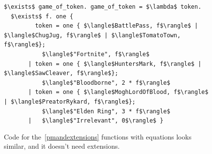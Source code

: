 \documentclass[manuscript,screen,12pt, nonacm]{acmart}
\begin{document}
\begin{figure}[ht]
        \begin{minipage}[h]{\linewidth}
          \verselst
          \begin{lstlisting}[numbers=none, basicstyle=\tiny, xleftmargin=9em, 
                            frame=single, showstringspaces=false]
$\exists$ game_of_token. game_of_token = $\lambda$ token. 
  $\exists$ f. one {
         token = one { $\langle$BattlePass, f$\rangle$ | $\langle$ChugJug, f$\rangle$ | $\langle$TomatoTown, f$\rangle$}; 
           $\langle$"Fortnite", f$\rangle$
       | token = one { $\langle$HuntersMark, f$\rangle$ | $\langle$SawCleaver, f$\rangle$}; 
           $\langle$"Bloodborne", 2 * f$\rangle$
       | token = one { $\langle$MoghLordOfBlood, f$\rangle$ | $\langle$PreatorRykard, f$\rangle$}; 
           $\langle$"Elden Ring", 3 * f$\rangle$
       |   $\langle$"Irrelevant", 0$\rangle$ }
          \end{lstlisting}
            \label{fig:versegot} 
        \vspace{4ex}
        \end{minipage}%
    \caption{Code for the~\ref{pmandextensions} functions with equations looks
    similar, and it doesn't need extensions.}
    \label{fig:verseextfuncs}
      \end{figure}
        
\end{document}
